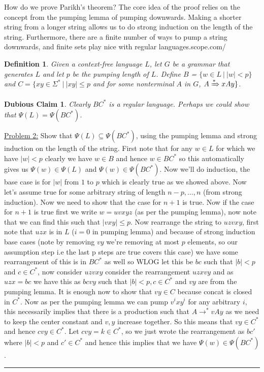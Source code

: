 \documentclass[11pt]{article}
\newtheorem{definition}[theorem]{Definition}
\newtheorem{badclaim}[theorem]{Dubious Claim}
\newenvironment{proof}{{\bf Proof:}}{\hfill\rule{2mm}{2mm}}
\begin{document}
How do we prove Parikh's theorem? The core idea of the proof relies on the concept from the pumping lemma of pumping downwards. Making a shorter string from a longer string allows us to do strong induction on the length of the string.  Furthermore, there are a finite number of ways to pump a string downwards, and finite sets play nice with regular languages.scope.com/

\begin{definition}
Given a context-free language $L$, let $G$ be a grammar that generates $L$ and let $p$ be the pumping length of $L$. Define $B$ = $\{w \in L ~|~ |w| < p\}$ and $C = \{xy \in \Sigma^* ~|~ |xy| \leq p$ and for some nonterminal $A$ in $G$, $A \xRightarrow{*} xAy\}$.
\end{definition}

\begin{badclaim}
 Clearly $BC^*$ is a regular language. Perhaps we could show that $\Psi(L) = \Psi(BC^*)$.
\end{badclaim}

\underline{Problem 2:} Show that $\Psi(L) \subseteq \Psi(BC^*)$, using the pumping lemma and strong induction on the length of the string. \hbreak \newline
\begin{proof}
  First note that for any $w \in L$ for which we have $|w| < p$ clearly we have $w \in  B$ and hence $w \in BC^{*}$ so this automatically gives us $\Psi(w) \in \Psi(L)$ and $\Psi(w) \in \Psi(BC^{*})$. Now we'll do induction, the base case is for $|w|$ from $1$ to $p$ which is clearly true as we showed above. Now let's assume true for some arbitrary string of length $n-p, \dots, n$ (from strong induction). Now we need to show that the case for $n + 1$ is true. Now if the case for $n + 1$ is true first we write $w = uvxyz$ (as per the pumping lemma), now note that we can find this such that $|vxy| \le p$. Now rearrange the string to $uz vxy$, first note that $uz x$ is in $L$ ($i = 0$ in pumping lemma) and because of strong induction base cases (note by removing $vy$ we're removing at most $p$ elements, so our assumption step i.e the last p steps are true covers this case) we have some rearrangement of this is in $BC^{*}$ as well so WLOG let this be $b c$ such that $|b| < p$ and $c \in C^{*}$, now consider $uz vxy$ consider the rearrangement $uzx vy$ and as $uzx = bc$ we have this as $b c vy$ such that $|b| < p, c \in C^{*}$  and $v y$ are from the pumping lemma. It is enough now to show that $vy \in C$ because concat is closed in $C^{*}$. Now as per the pumping lemma we can pump $v^{i}xy^{i}$ for any arbitrary $i$, this necessarily implies that there  is a production such that $A \to^{*} v A y$ as we need to keep the center constant and $v,y$ increase together. So this means that $vy  \in C^{*}$ and hence $c vy \in C^{*}$. Let $cvy = k \in C^{*}$, so we just wrote the rearrangement as $b c'$ where $|b| < p$ and $c' \in C^{*}$ and hence this implies that we have $\Psi(w) \in \Psi(BC^{*})$.
\end{proof}
\vspace{1em}
\end{document}
